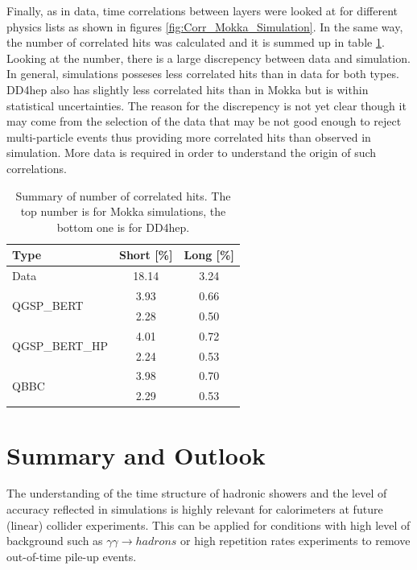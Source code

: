 Finally, as in data, time correlations between layers were looked at for different physics lists as shown in figures \ref{fig:Corr_Mokka_Simulation}. In the same way, the number of correlated hits was calculated and it is summed up in table \ref{table:Correlation_DataSim}. Looking at the number, there is a large discrepency between data and simulation. In general, simulations posseses less correlated hits than in data for both types. DD4hep also has slightly less correlated hits than in Mokka but is within statistical uncertainties. The reason for the discrepency is not yet clear though it may come from the selection of the data that may be not good enough to reject multi-particle events thus providing more correlated hits than observed in simulation. More data is required in order to understand the origin of such correlations.

\begin{table}[htb!]
	\centering
	\caption{Summary of number of correlated hits. The top number is for Mokka simulations, the bottom one is for DD4hep.}
	\label{table:Correlation_DataSim}
	\begin{tabular}{@{} |l|cc| @{}}
		\hline
		Type & Short [\%] & Long [\%] \\
		\hline
		Data & 18.14 & 3.24\\
		\hline
		\multirow{2}{*}{QGSP\_BERT} & 3.93 & 0.66\\ & 2.28 & 0.50\\
		\hline
		\multirow{2}{*}{QGSP\_BERT\_HP} & 4.01 & 0.72\\ & 2.24 & 0.53\\
		\hline
		\multirow{2}{*}{QBBC} & 3.98 & 0.70\\ & 2.29 & 0.53\\
		\hline
	\end{tabular}
\end{table}

\section{Summary and Outlook}

The understanding of the time structure of hadronic showers and the level of accuracy reflected in \geant simulations is highly relevant for calorimeters at future (linear) collider experiments. This can be applied for conditions with high level of background such as $\gamma\gamma \rightarrow hadrons$ or high repetition rates experiments to remove out-of-time pile-up events.

